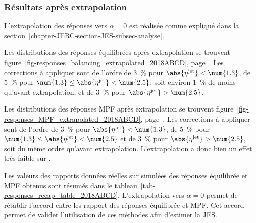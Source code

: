 \subsubsection{Résultats après extrapolation}\label{chapter-JERC-section-JES-subsec-results-subsubsec-after_extrap}
L'extrapolation des réponses vers $\alpha=0$ est réalisée comme expliqué dans la section~\ref{chapter-JERC-section-JES-subsec-analyse}.
\par Les distributions des réponses équilibrées après extrapolation se trouvent figure~\ref{fig-responses_balancing_extrapolated_2018ABCD}, page~\pageref{fig-responses_balancing_extrapolated_2018ABCD}.
Les corrections à appliquer sont de l'ordre
de \SI{3}{\%} pour $\abs{\eta^\text{jet}} < \num{1.3}$,
de \SI{5}{\%} pour $\num{1.3} \leq \abs{\eta^\text{jet}} < \num{2.5}$, soit environ \SI{1}{\%} de moins qu'avant extrapolation, et
de \SI{3}{\%} pour $\abs{\eta^\text{jet}} > \num{2.5}$.
\par Les distributions des réponses MPF après extrapolation se trouvent figure~\ref{fig-responses_MPF_extrapolated_2018ABCD}, page~\pageref{fig-responses_MPF_extrapolated_2018ABCD}.
Les corrections à appliquer sont de l'ordre
de \SI{3}{\%} pour $\abs{\eta^\text{jet}} < \num{1.3}$,
de \SI{5}{\%} pour $\num{1.3} \leq \abs{\eta^\text{jet}} < \num{2.5}$ et
de \SI{3}{\%} pour $\abs{\eta^\text{jet}} > \num{2.5}$,
soit du même ordre qu'avant extrapolation.
L'extrapolation a donc bien un effet très faible sur \RMPF.
\par Les valeurs des rapports données réelles sur simulées des réponses équilibrée et MPF obtenus sont résumés dans le tableau~\ref{tab-responses_recap_table_2018ABCD}.
L'extrapolation vers $\alpha=0$ permet de rétablir l'accord entre les rapport des réponses équilibrée et MPF.
Cet accord permet de valider l'utilisation de ces méthodes afin d'estimer la JES.



